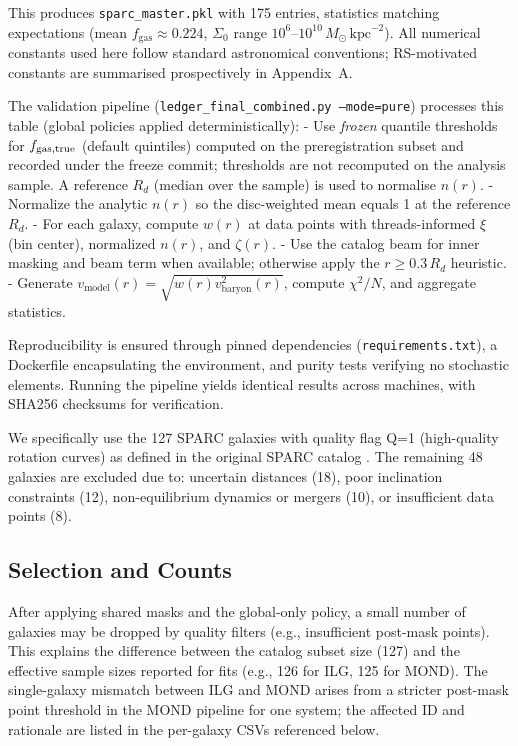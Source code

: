 \documentclass[usenatbib]{mnras}
\begin{document}
This produces \texttt{sparc\_master.pkl} with 175 entries, statistics matching expectations (mean $f_\mathrm{gas} \approx 0.224$, $\Sigma_0$ range $10^6$--$10^{10}\,M_\odot\,\mathrm{kpc}^{-2}$). All numerical constants used here follow standard astronomical conventions; RS-motivated constants are summarised prospectively in Appendix~A.

The validation pipeline (\texttt{ledger\_final\_combined.py --mode=pure}) processes this table (global policies applied deterministically):
- Use \emph{frozen} quantile thresholds for $f_{\rm gas,true}$ (default quintiles) computed on the preregistration subset and recorded under the freeze commit; thresholds are not recomputed on the analysis sample. A reference $R_d$ (median over the sample) is used to normalise $n(r)$.
- Normalize the analytic $n(r)$ so the disc-weighted mean equals 1 at the reference $R_d$.
- For each galaxy, compute $w(r)$ at data points with threads-informed $\xi$ (bin center), normalized $n(r)$, and $\zeta(r)$.
- Use the catalog beam for inner masking and beam term when available; otherwise apply the $r\ge0.3\,R_d$ heuristic.
- Generate $v_\mathrm{model}(r) = \sqrt{w(r) v_\mathrm{baryon}^2(r)}$, compute $\chi^2/N$, and aggregate statistics.

Reproducibility is ensured through pinned dependencies (\texttt{requirements.txt}), a Dockerfile encapsulating the environment, and purity tests verifying no stochastic elements. Running the pipeline yields identical results across machines, with SHA256 checksums for verification.

We specifically use the 127 SPARC galaxies with quality flag Q=1 (high-quality rotation curves) as defined in the original SPARC catalog \citep{lelli2016sparc}. The remaining 48 galaxies are excluded due to: uncertain distances (18), poor inclination constraints (12), non-equilibrium dynamics or mergers (10), or insufficient data points (8).

\subsection{Selection and Counts}
\noindent After applying shared masks and the global-only policy, a small number of galaxies may be dropped by quality filters (e.g., insufficient post-mask points). This explains the difference between the catalog subset size (127) and the effective sample sizes reported for fits (e.g., 126 for ILG, 125 for MOND). The single-galaxy mismatch between ILG and MOND arises from a stricter post-mask point threshold in the MOND pipeline for one system; the affected ID and rationale are listed in the per-galaxy CSVs referenced below.
\end{document}
